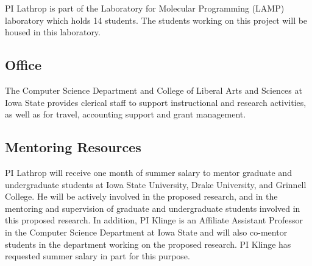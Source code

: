 \documentclass[11pt]{article}
\begin{document}
    PI Lathrop is part of the Laboratory for Molecular Programming (LAMP)
    laboratory which holds 14 students. The students working
    on this project will be housed in this laboratory.

    \subsection*{Office}
    The Computer Science Department and College of Liberal Arts and
    Sciences at Iowa State provides 
    clerical staff to support instructional and research activities, as
    well as for  travel, accounting support and grant management.

    \subsection*{Mentoring Resources}
    PI Lathrop will receive one month of summer salary to mentor graduate and undergraduate students at Iowa State University, Drake University, and Grinnell College. He will be actively involved in the proposed research, and in the mentoring and supervision of graduate and undergraduate students involved in this proposed research.  In addition, PI Klinge is an Affiliate Assistant Professor in the Computer Science Department at Iowa State and will also co-mentor students in the department working on the proposed research.  PI Klinge has requested summer salary in part for this purpose.
\end{document}

